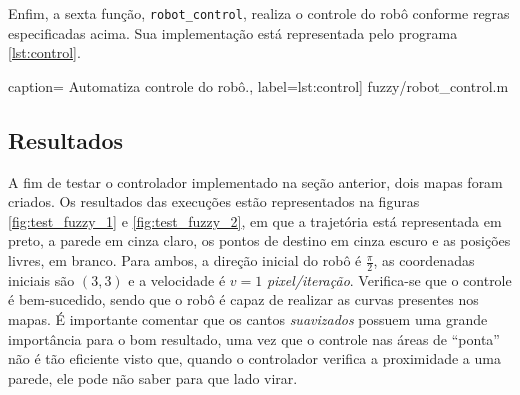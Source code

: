 	\vspace{12pt}
	
	Enfim, a sexta função, \texttt{robot\_control}, realiza o controle do robô
	conforme regras especificadas acima. Sua implementação está representada pelo
	programa \ref{lst:control}.
	
	 caption={  
	Automatiza controle do robô.}, label={lst:control}] {fuzzy/robot_control.m}  
	
	\subsection {Resultados}
	
	A fim de testar o controlador implementado na seção anterior, dois mapas foram
	criados. Os resultados das execuções estão representados na figuras
	\ref{fig:test_fuzzy_1} e \ref{fig:test_fuzzy_2}, em que a trajetória está
	representada em preto, a parede em cinza claro, os pontos de destino em cinza
	escuro e as posições livres, em branco. Para ambos, a direção inicial do robô é
	\(\frac{\pi}{2}\), as coordenadas iniciais são \((3,3)\) e a velocidade é \(v =
	1 \) \textit{pixel/iteração}. Verifica-se que o controle é bem-sucedido, sendo
	que o robô é capaz de realizar as curvas presentes nos mapas. É importante
	comentar que os cantos \textit{suavizados} possuem uma grande importância para o
	bom resultado, uma vez que o controle nas áreas de ``ponta'' não é tão eficiente
	visto que, quando o controlador verifica a proximidade a uma parede, ele pode
	não saber para que lado virar.
		
	\FloatBarrier
			    
